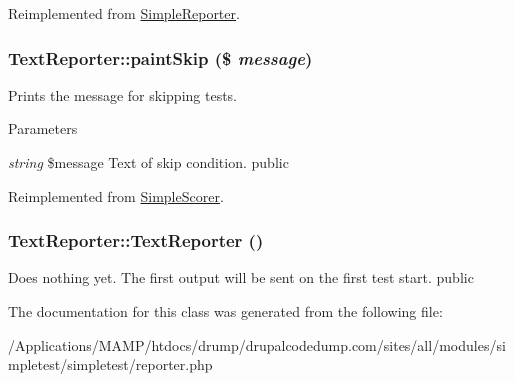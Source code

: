 Reimplemented from \hyperlink{class_simple_reporter_a682fc7003bca1442734b7ddbdf270b75}{SimpleReporter}.\hypertarget{class_text_reporter_a3577d6c0e6e237592c2b37b79ff3d717}{
\subsubsection[{paintSkip}]{\setlength{\rightskip}{0pt plus 5cm}TextReporter::paintSkip (\$ {\em message})}}
\label{class_text_reporter_a3577d6c0e6e237592c2b37b79ff3d717}
Prints the message for skipping tests. 
\begin{DoxyParams}{Parameters}
\item[{\em string}]\$message Text of skip condition.  public \end{DoxyParams}


Reimplemented from \hyperlink{class_simple_scorer_aa82186cb9bf706d675336aefd6ba355f}{SimpleScorer}.\hypertarget{class_text_reporter_ac26356a45919f2e713ccef2c37a82eb8}{
\subsubsection[{TextReporter}]{\setlength{\rightskip}{0pt plus 5cm}TextReporter::TextReporter ()}}
\label{class_text_reporter_ac26356a45919f2e713ccef2c37a82eb8}
Does nothing yet. The first output will be sent on the first test start.  public 

The documentation for this class was generated from the following file:\begin{DoxyCompactItemize}
\item 
/Applications/MAMP/htdocs/drump/drupalcodedump.com/sites/all/modules/simpletest/simpletest/reporter.php\end{DoxyCompactItemize}
